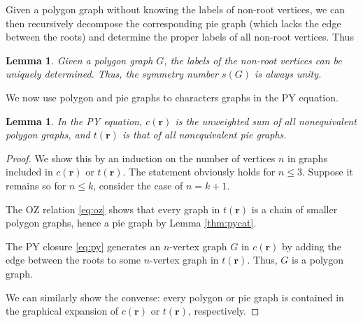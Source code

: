 \documentclass[preprint]{revtex4-1}
\newtheorem{lemm}[thrm]{Lemma}
\newcommand{\vct}[1]{\mathbf{#1}}
\providecommand{\vr}{} %
\renewcommand{\vr}{\vct{r}}
\begin{document}
Given a polygon graph without knowing the labels of non-root vertices,
we can then recursively decompose the corresponding pie graph
(which lacks the edge between the roots)
and determine the proper labels of all non-root vertices.
%
Thus

\begin{lemm}
Given a polygon graph $G$,
  the labels of the non-root vertices
  can be uniquely determined.
Thus,
  the symmetry number $s(G)$ is always unity.
  \label{thm:polygonsymnum}
\end{lemm}



We now use polygon and pie graphs to characters
  graphs in the PY equation.

\begin{lemm}
In the PY equation,
  $c(\vr)$ is the unweighted sum of
  all nonequivalent polygon graphs,
  and $t(\vr)$ is that of all nonequivalent
  pie graphs\cite{rice1965}.
\label{thm:pycrsum}
\end{lemm}

\begin{proof}
We show this by an induction on the number of vertices $n$ in
  graphs included in $c(\vr)$ or $t(\vr)$.
%
The statement obviously holds for $n \le 3$.
%
Suppose it remains so for $n \le k$,
consider the case of $n = k + 1$.

The OZ relation \eqref{eq:oz}
  shows that every graph in $t(\vr)$
  is a chain of smaller polygon graphs,
  hence a pie graph by Lemma \ref{thm:pycat}.

The PY closure \eqref{eq:py} generates
  an $n$-vertex graph $G$ in $c(\vr)$
  by adding the edge between the roots
  to some $n$-vertex graph in $t(\vr)$.
%
Thus, $G$ is a polygon graph.

We can similarly show the converse:
  every polygon or pie graph
  is contained in the graphical expansion
  of $c(\vr)$ or $t(\vr)$,
  respectively.
\end{proof}


\end{document}
